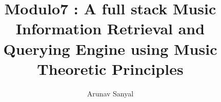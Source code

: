 \documentclass[12pt,oneside,final]{thesis}
\begin{document}
\title{Modulo7 : A full stack Music Information Retrieval and Querying Engine using Music Theoretic Principles}
\author{Arunav Sanyal}
\thesis
\masterscience
\copyrightnotice
















\end{document}
